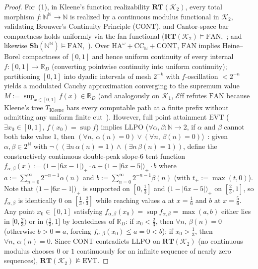 \documentclass[10pt,twoside,openright]{book}
\theoremstyle{crmplain}
\theoremstyle{crmdef}
\theoremstyle{crmremark}
\newcommand{\Eff}{\mathcal{E}\mathrm{ff}}
\begin{document}
\begin{proof}
For~(1), in Kleene's function realizability $\mathbf{RT}(\mathcal{K}_2)$, every total morphism $f : \mathbb{N}^{\mathbb{N}} \to \mathbb{N}$ is realized by a continuous modulus functional in $\mathcal{K}_2$, validating Brouwer's Continuity Principle ($\mathrm{CONT}$), and Cantor-space bar compactness holds uniformly via the fan functional ($\mathbf{RT}(\mathcal{K}_2) \models \mathrm{FAN}$,~\cite[\S 4.3]{vanOosten08}; and likewise $\mathbf{Sh}(\mathbb{N}^{\mathbb{N}}) \models \mathrm{FAN}$,~\cite[Thm.~3.2]{FourmanHyland79}). Over $\mathrm{HA}^\omega + \mathrm{CC}_{\mathbb{N}} + \mathrm{CONT}$, $\mathrm{FAN}$ implies Heine--Borel compactness of $[0,1]$ and hence uniform continuity of every internal $f : [0,1] \to \mathbb{R}_D$ (converting pointwise continuity into uniform continuity); partitioning $[0,1]$ into dyadic intervals of mesh $2^{-k}$ with $f$-oscillation $< 2^{-n}$ yields a modulated Cauchy approximation converging to the supremum value $M := \sup_{x \in [0,1]} f(x) \in \mathbb{R}_D$ (and analogously on $\mathcal{K}_1$, $\Eff$ refutes $\mathrm{FAN}$ because Kleene's tree $T_{\mathrm{Kleene}}$ bars every computable path at a finite prefix without admitting any uniform finite cut~\cite[\S 3.2]{vanOosten08}). However, full point attainment $\mathrm{EVT}$ ($\exists x_0 \in [0,1],\, f(x_0) = \sup f$) implies $\mathrm{LLPO}$ ($\forall \alpha, \beta : \mathbb{N} \to 2$, if $\alpha$ and $\beta$ cannot both take value $1$, then $(\forall n,\, \alpha(n) = 0) \lor (\forall n,\, \beta(n) = 0)$)~\cite[Ch.~2]{BridgesRichman87}: given $\alpha, \beta \in 2^{\mathbb{N}}$ with $\neg((\exists n\, \alpha(n) = 1) \wedge (\exists n\, \beta(n) = 1))$, define the constructively continuous double-peak slope-6 tent function $f_{\alpha,\beta}(x) := \bigl(1 - |6x - 1|\bigr)_+ \cdot a + \bigl(1 - |6x - 5|\bigr)_+ \cdot b$ where $a := \sum_{n=0}^{\infty} 2^{-n-1} \alpha(n)$ and $b := \sum_{n=0}^{\infty} 2^{-n-1} \beta(n)$ (with $t_+ := \max(t,0)$). Note that $\bigl(1 - |6x - 1|\bigr)_+$ is supported on $[0, \tfrac{1}{3}]$ and $\bigl(1 - |6x - 5|\bigr)_+$ on $[\tfrac{2}{3}, 1]$, so $f_{\alpha,\beta}$ is identically $0$ on $[\tfrac{1}{3}, \tfrac{2}{3}]$ while reaching values $a$ at $x = \tfrac{1}{6}$ and $b$ at $x = \tfrac{5}{6}$. Any point $x_0 \in [0,1]$ satisfying $f_{\alpha,\beta}(x_0) = \sup f_{\alpha,\beta} = \max(a, b)$ either lies in $[0, \tfrac{2}{3})$ or in $(\tfrac{1}{3}, 1]$ by locatedness of $\mathbb{R}_D$: if $x_0 < \tfrac{2}{3}$, then $\forall n,\, \beta(n) = 0$ (otherwise $b > 0 = a$, forcing $f_{\alpha,\beta}(x_0) \le a = 0 < b$); if $x_0 > \tfrac{1}{3}$, then $\forall n,\, \alpha(n) = 0$. Since $\mathrm{CONT}$ contradicts $\mathrm{LLPO}$ on $\mathbf{RT}(\mathcal{K}_2)$ (no continuous modulus chooses $0$ or $1$ continuously for an infinite sequence of nearly zero sequences), $\mathbf{RT}(\mathcal{K}_2) \not\models \mathrm{EVT}$.


\end{proof}
\end{document}
